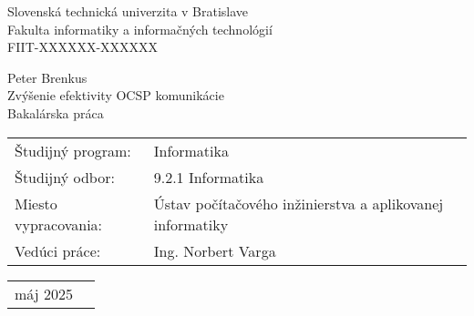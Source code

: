 \documentclass[12pt, twoside]{book}
\def\mfrok{máj 2025}
\def\mfnazov{Zvýšenie efektivity OCSP komunikácie}
\def\mftyp{Bakalárska práca}
\def\mfautor{Peter Brenkus}
\def\mfveduci{Ing. Norbert Varga}
\def\mfodbor{9.2.1 Informatika}%
\def\program{ Informatika }
\def\mfpracovisko{  Ústav počítačového inžinierstva a aplikovanej informatiky }
\begin{document}
 
   
\frontmatter





\thispagestyle{empty}
\noindent

\begin{center}
\sc  
\large

Slovenská technická univerzita v Bratislave\\
Fakulta informatiky a informačných technológií\\
\bigskip
FIIT-XXXXXX-XXXXXX %

\vfill

\mfautor\\
\bigskip
{\mfnazov}\\
\bigskip
\mftyp
\end{center}

\vfill

\noindent
\begin{tabular}{@{}ll}
Študijný program: & \program \\
Študijný odbor: & \mfodbor \\
Miesto vypracovania: & \mfpracovisko \\
Vedúci práce: & \mfveduci \\
\end{tabular}

\bigskip



\noindent
\begin{tabular}{@{}ll}
\mfrok\\
\end{tabular}

\eject %



\newpage\null\thispagestyle{empty}\newpage




\newpage\null\thispagestyle{empty}\newpage

\end{document}
